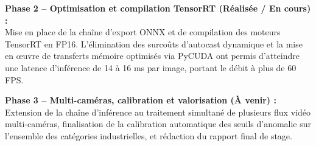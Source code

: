 \documentclass[11pt,a4paper]{article}
\begin{document}
\textbf{Phase 2 -- Optimisation et compilation TensorRT (Réalisée / En cours) :} \\
Mise en place de la chaîne d'export ONNX et de compilation des moteurs TensorRT en FP16. L'élimination des surcoûts d'autocast dynamique et la mise en œuvre de transferts mémoire optimisés via PyCUDA ont permis d'atteindre une latence d'inférence de 14 à 16 ms par image, portant le débit à plus de 60 FPS.

\textbf{Phase 3 -- Multi-caméras, calibration et valorisation (À venir) :} \\
Extension de la chaîne d'inférence au traitement simultané de plusieurs flux vidéo multi-caméras, finalisation de la calibration automatique des seuils d'anomalie sur l'ensemble des catégories industrielles, et rédaction du rapport final de stage.
\end{document}
